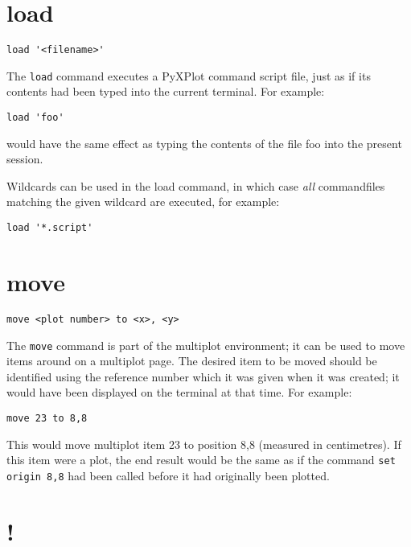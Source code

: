 \documentclass[a4paper,onecolumn,11pt]{book}
\begin{document}
\section{load}

\begin{verbatim}
load '<filename>'
\end{verbatim}

The {\tt load} command executes a PyXPlot command script file, just as if its
contents had been typed into the current terminal. For example:

\begin{verbatim}
load 'foo'
\end{verbatim}

\noindent would have the same effect as typing the contents of the file foo
into the present session.

Wildcards can be used in the load command, in which case \textit{all}
commandfiles matching the given wildcard are executed, for example:

\begin{verbatim}
load '*.script'
\end{verbatim}


\section{move}

\begin{verbatim}
move <plot number> to <x>, <y>
\end{verbatim}

The {\tt move} command is part of the multiplot environment; it can be used to
move items around on a multiplot page. The desired item to be moved should be
identified using the reference number which it was given when it was created;
it would have been displayed on the terminal at that time. For example:

\begin{verbatim}
move 23 to 8,8
\end{verbatim}
  
\noindent This would move multiplot item 23 to position 8,8 (measured in
centimetres). If this item were a plot, the end result would be the same as if
the command {\tt set origin 8,8} had been called before it had originally been
plotted.

\section{!}
\end{document}
